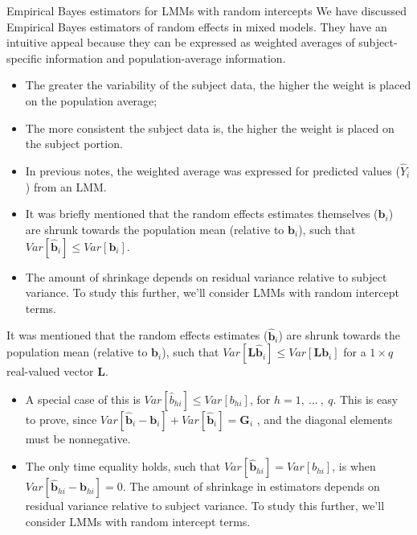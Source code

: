 \documentclass[
  9pt,
  ignorenonframetext,
]{beamer}
\begin{document}
\begin{frame}{Empirical Bayes estimators for LMMs with random
intercepts}
\protect\hypertarget{empirical-bayes-estimators-for-lmms-with-random-intercepts}{}
We have discussed Empirical Bayes estimators of random effects in mixed
models. They have an intuitive appeal because they can be expressed as
weighted averages of subject-specific information and population-average
information.

\begin{itemize}
\item
  The greater the variability of the subject data, the higher the weight
  is placed on the population average;
\item
  The more consistent the subject data is, the higher the weight is
  placed on the subject portion.
\item
  In previous notes, the weighted average was expressed for predicted
  values (\(\hat Y_i\)) from an LMM.
\item
  It was briefly mentioned that the random effects estimates themselves
  (\(\pmb {\hat b}_i\)) are shrunk towards the population mean (relative
  to \(\pmb b_i\)), such that
  \(Var[ \pmb {\hat b}_i ] \leq Var[\pmb b_i]\).
\item
  The amount of shrinkage depends on residual variance relative to
  subject variance. To study this further, we'll consider LMMs with
  random intercept terms.
\end{itemize}
\end{frame}

\begin{frame}{}
\protect\hypertarget{section-6}{}
It was mentioned that the random effects estimates (\(\pmb {\hat b}_i\))
are shrunk towards the population mean (relative to \(\pmb b_i\)), such
that \(Var[\pmb L \pmb {\hat b}_i] \leq Var[\pmb {Lb}_i ]\) for a
\(1 \times q\) real-valued vector \(\pmb L\).

\begin{itemize}
\item
  A special case of this is \(Var[{\hat b}_{hi}] \leq Var[b_{hi}]\), for
  \(h = 1,\ ...\ ,\ q\). This is easy to prove, since
  \(Var[ \pmb {\hat b}_i - \pmb b_i] + Var[\pmb {\hat b}_i] = \pmb G_i\)
  , and the diagonal elements must be nonnegative.
\item
  The only time equality holds, such that
  \(Var[\pmb {\hat b}_{hi}] = Var[b_{hi}]\), is when
  \(Var[\pmb {\hat b}_{hi} - \pmb b_{hi}]=0\). The amount of shrinkage
  in estimators depends on residual variance relative to subject
  variance. To study this further, we'll consider LMMs with random
  intercept terms.
\end{itemize}
\end{frame}
\end{document}
